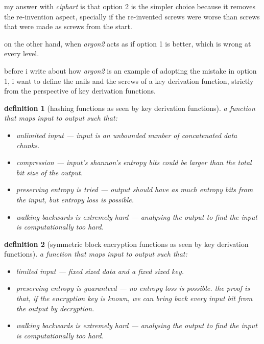 \documentclass[twocolumn]{article}
\newtheorem{definition}{definition}
\begin{document}
my answer with \emph{ciphart} is that option 2 is the simpler choice
because it removes the re-invention aspect, specially if the re-invented
screws were worse than screws that were made as screws from the start.

on the other hand, when \emph{argon2} acts as if option 1 is better, which
is wrong at every level.

before i write about how \emph{argon2} is an example of adopting the
mistake in option 1, i want to define the nails and the screws of a key
derivation function, strictly from the perspective of key derivation
functions.

\begin{definition}[hashing functions as seen by key derivation
functions]\label{def_kdf_hash}
    a function that maps input to output such that:
    \begin{itemize}
        \item unlimited input --- input is an unbounded number of
        concatenated data chunks.
        \item compression --- input's shannon's entropy bits could be
        larger than the total bit size of the output.
        \item preserving entropy is tried --- output should have as much
        entropy bits from the input, but entropy loss is possible.
        \item walking backwards is extremely hard --- analysing the output
        to find the input is computationally too hard.
    \end{itemize}
\end{definition}

\begin{definition}[symmetric block encryption functions as seen by key
derivation functions]\label{def_kdf_enc}
    a function that maps input to output such that:
    \begin{itemize}
        \item limited input --- fixed sized data and a fixed sized
        key.
        \item preserving entropy is guaranteed --- no entropy loss is
        possible.  the proof is that, if the encryption key is known, we
        can bring back every input bit from the output by decryption.
        \item walking backwards is extremely hard --- analysing the output
        to find the input is computationally too hard.
    \end{itemize}
\end{definition}
\end{document}

